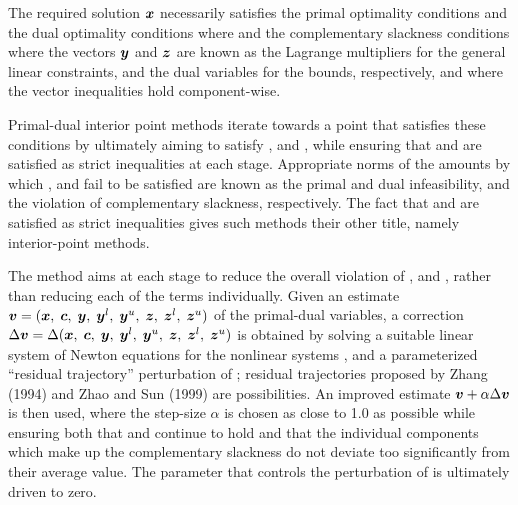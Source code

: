 \documentclass{galahad}
\begin{document}

\galmethod
The required solution ${\bm{x}}$ necessarily satisfies
the primal optimality conditions
and
the dual optimality conditions
where
and the complementary slackness conditions
where the vectors ${\bm{y}}$ and ${\bm{z}}$ are known as the Lagrange multipliers for
the general linear constraints, and the dual variables for the bounds,
respectively, and where the vector inequalities hold component-wise.

Primal-dual interior point methods iterate towards a point
that satisfies these conditions by ultimately aiming to satisfy
,  and , while ensuring that
 and  are
satisfied as strict inequalities at each stage.
Appropriate norms of the amounts by
which ,  and  fail to be satisfied are known as the
primal and dual infeasibility, and the violation of complementary slackness,
respectively. The fact that  and  are satisfied as strict
inequalities gives such methods their other title, namely
interior-point methods.

The method aims at each stage to reduce the
overall violation of ,  and ,
rather than reducing each of the terms individually. Given an estimate
${\bm{v}} = ({\bm{x}}, \; {\bm{c}}, \; {\bm{y}}, \; {\bm{y}}^{l}, \;
{\bm{y}}^{u}, \; {\bm{z}}, \; {\bm{z}}^{l}, \; {\bm{z}}^{u})$
of the primal-dual variables, a correction
$\Delta {\bm{v}} = \Delta ({\bm{x}}, \; {\bm{c}}, \; {\bm{y}}, \; {\bm{y}}^{l},
 \; {\bm{y}}^{u} ,\;{\bm{z}},\;{\bm{z}}^{l} ,\;{\bm{z}}^{u} )$
is obtained by solving a suitable linear system of Newton equations for the
nonlinear systems ,  and a parameterized ``residual
trajectory'' perturbation of ; residual trajectories
proposed by Zhang (1994) and Zhao and Sun (1999) are possibilities.
An improved estimate ${\bm{v}} + \alpha \Delta {\bm{v}}$
is then used, where the step-size $\alpha$
is chosen as close to 1.0 as possible while ensuring both that
 and  continue to hold and that the individual components
which make up the complementary slackness
 do not deviate too significantly
from their average value. The parameter that controls the perturbation
of  is ultimately driven to zero.
\end{document}
